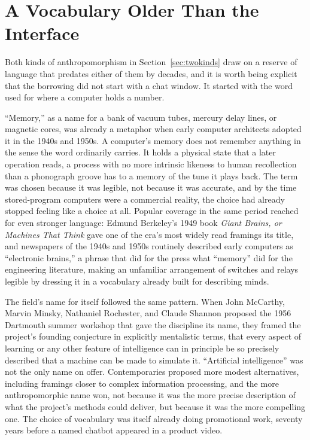 \documentclass[11pt]{article}
\begin{document}
\section{A Vocabulary Older Than the Interface}
\label{sec:vocabulary}

Both kinds of anthropomorphism in Section~\ref{sec:twokinds} draw on a reserve of language that predates either of them by decades, and it is worth being explicit that the borrowing did not start with a chat window. It started with the word used for where a computer holds a number.

``Memory,'' as a name for a bank of vacuum tubes, mercury delay lines, or magnetic cores, was already a metaphor when early computer architects adopted it in the 1940s and 1950s. A computer's memory does not remember anything in the sense the word ordinarily carries. It holds a physical state that a later operation reads, a process with no more intrinsic likeness to human recollection than a phonograph groove has to a memory of the tune it plays back. The term was chosen because it was legible, not because it was accurate, and by the time stored-program computers were a commercial reality, the choice had already stopped feeling like a choice at all. Popular coverage in the same period reached for even stronger language: Edmund Berkeley's 1949 book \emph{Giant Brains, or Machines That Think}\cite{berkeley} gave one of the era's most widely read framings its title, and newspapers of the 1940s and 1950s routinely described early computers as ``electronic brains,'' a phrase that did for the press what ``memory'' did for the engineering literature, making an unfamiliar arrangement of switches and relays legible by dressing it in a vocabulary already built for describing minds.

The field's name for itself followed the same pattern. When John McCarthy, Marvin Minsky, Nathaniel Rochester, and Claude Shannon proposed the 1956 Dartmouth summer workshop that gave the discipline its name, they framed the project's founding conjecture in explicitly mentalistic terms, that every aspect of learning or any other feature of intelligence can in principle be so precisely described that a machine can be made to simulate it\cite{mccarthy1955}. ``Artificial intelligence'' was not the only name on offer. Contemporaries proposed more modest alternatives, including framings closer to complex information processing, and the more anthropomorphic name won, not because it was the more precise description of what the project's methods could deliver, but because it was the more compelling one. The choice of vocabulary was itself already doing promotional work, seventy years before a named chatbot appeared in a product video.
\end{document}
